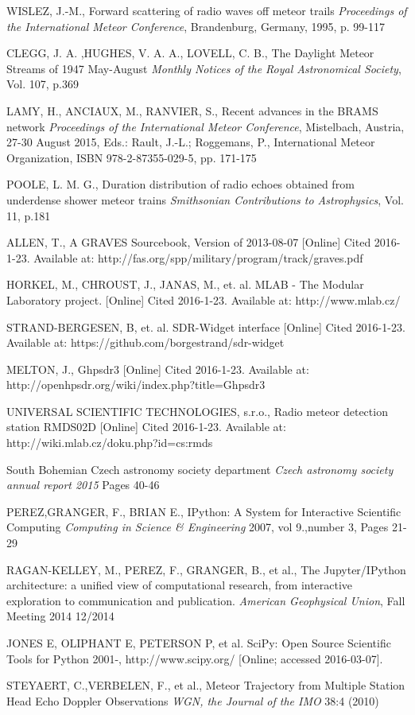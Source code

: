 \documentclass[twoside]{ctuthesis}
\theoremstyle{plain}
\theoremstyle{definition}
\theoremstyle{note}
\begin{document}
\begin{thebibliography}{99}
WISLEZ, J.-M.,
Forward scattering of radio waves off meteor trails
\emph{Proceedings of the International Meteor Conference}, Brandenburg, Germany, 1995, p. 99-117

CLEGG, J. A. ,HUGHES,  V. A. A., LOVELL, C. B., 
The Daylight Meteor Streams of 1947 May-August
\emph{Monthly Notices of the Royal Astronomical Society}, Vol. 107, p.369

LAMY, H., ANCIAUX, M., RANVIER, S.,
Recent advances in the BRAMS network
\emph{Proceedings of the International Meteor Conference}, Mistelbach, Austria, 27-30 August 2015, Eds.: Rault, J.-L.; Roggemans, P., International Meteor Organization, ISBN 978-2-87355-029-5, pp. 171-175

POOLE, L. M. G.,
Duration distribution of radio echoes obtained from underdense shower meteor trains
\emph{Smithsonian Contributions to Astrophysics}, Vol. 11, p.181

ALLEN, T.,
A GRAVES Sourcebook, Version of 2013-08-07
[Online] Cited 2016-1-23. Available at: http://fas.org/spp/military/program/track/graves.pdf

HORKEL, M., CHROUST, J., JANAS, M., et. al. 
MLAB - The Modular Laboratory project.
[Online] Cited 2016-1-23. Available at: http://www.mlab.cz/

STRAND-BERGESEN, B, et. al.
SDR-Widget interface
[Online] Cited 2016-1-23. Available at: https://github.com/borgestrand/sdr-widget

MELTON, J.,
Ghpsdr3
[Online] Cited 2016-1-23. Available at: http://openhpsdr.org/wiki/index.php?title=Ghpsdr3

UNIVERSAL SCIENTIFIC TECHNOLOGIES, s.r.o.,  
Radio meteor detection station RMDS02D
[Online] Cited 2016-1-23. Available at: http://wiki.mlab.cz/doku.php?id=cs:rmds

South Bohemian Czech astronomy society department
\emph{Czech astronomy society annual report 2015}
Pages 40-46

PEREZ,GRANGER, F.,  BRIAN E.,
IPython: A System for Interactive Scientific Computing
\emph{Computing in Science \& Engineering}
2007, vol 9.,number 3,  Pages 21-29

RAGAN-KELLEY, M., PEREZ, F., GRANGER, B., et al.,
The Jupyter/IPython architecture: a unified view of computational research, from interactive exploration to communication and publication.
\emph{American Geophysical Union}, Fall Meeting 2014
12/2014

JONES E, OLIPHANT E, PETERSON P, et al.
SciPy: Open Source Scientific Tools for Python
2001-, http://www.scipy.org/ [Online; accessed 2016-03-07].

STEYAERT, C.,VERBELEN, F., et al.,
Meteor Trajectory from Multiple Station Head Echo Doppler Observations
\emph{WGN, the Journal of the IMO} 38:4 (2010)

\end{thebibliography}
\end{document}
